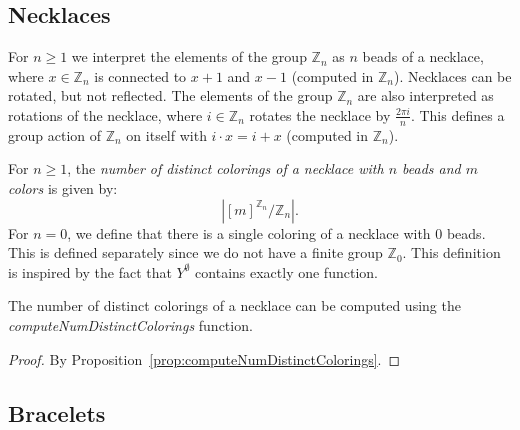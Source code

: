 \subsection{Necklaces}

For $n \geq 1$ we interpret the elements of the group $\mathbb{Z}_n$ as $n$ beads of a necklace, where $x \in \mathbb{Z}_n$ is connected to $x + 1$ and $x - 1$ (computed in $\mathbb{Z}_n$). Necklaces can be rotated, but not reflected. The elements of the group $\mathbb{Z}_n$ are also interpreted as rotations of the necklace, where $i \in \mathbb{Z}_n$ rotates the necklace by $\frac{2\pi i}{n}$. This defines a group action of $\mathbb{Z}_n$ on itself with $i \cdot x = i + x$ (computed in $\mathbb{Z}_n$).

\begin{definition}
  \label{def:numDistinctColoringsOfNecklace}
  \leanok
  For $n \geq 1$, the \emph{number of distinct colorings of a necklace with $n$ beads and $m$ colors} is given by:
  \begin{equation*}
    |[m]^{\mathbb{Z}_n}/\mathbb{Z}_n|.
  \end{equation*}
  For $n = 0$, we define that there is a single coloring of a necklace with $0$ beads. This is defined separately since we do not have a finite group $\mathbb{Z}_0$. This definition is inspired by the fact that $Y^\emptyset$ contains exactly one function.
\end{definition}

\begin{proposition}
  \label{prop:computeNumDistinctColoringsOfNecklace-eq-numDistinctColoringsOfNecklace}
  \leanok
  The number of distinct colorings of a necklace can be computed using the \emph{computeNumDistinctColorings} function.
\end{proposition}

\begin{proof}
  \leanok
  By Proposition~\ref{prop:computeNumDistinctColorings}.
\end{proof}

\subsection{Bracelets}

